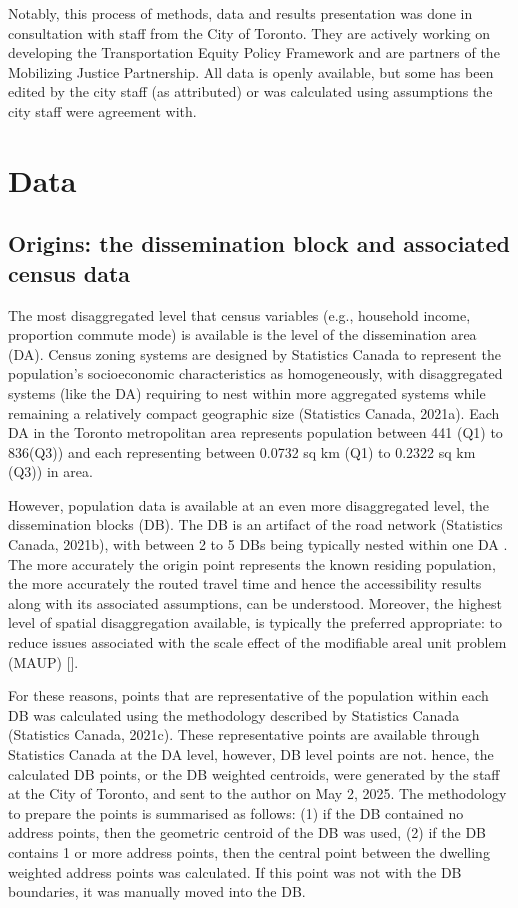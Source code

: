 \documentclass[
11pt, %
oneside, %
english, %
singlespacing, %
]{macthesis} %
\begin{document}
Notably, this process of methods, data and results presentation was done in consultation with staff from the City of Toronto. They are actively working on developing the Transportation Equity Policy Framework and are partners of the Mobilizing Justice Partnership. All data is openly available, but some has been edited by the city staff (as attributed) or was calculated using assumptions the city staff were agreement with.

\section{Data}\label{data}

\subsection{Origins: the dissemination block and associated census data}\label{origins-the-dissemination-block-and-associated-census-data}

The most disaggregated level that census variables (e.g., household income, proportion commute mode) is available is the level of the dissemination area (DA). Census zoning systems are designed by Statistics Canada to represent the population's socioeconomic characteristics as homogeneously, with disaggregated systems (like the DA) requiring to nest within more aggregated systems while remaining a relatively compact geographic size (Statistics Canada, 2021a). Each DA in the Toronto metropolitan area represents population between 441 (Q1) to 836(Q3)) and each representing between 0.0732 sq km (Q1) to 0.2322 sq km (Q3)) in area.

However, population data is available at an even more disaggregated level, the dissemination blocks (DB). The DB is an artifact of the road network (Statistics Canada, 2021b), with between 2 to 5 DBs being typically nested within one DA . The more accurately the origin point represents the known residing population, the more accurately the routed travel time and hence the accessibility results along with its associated assumptions, can be understood. Moreover, the highest level of spatial disaggregation available, is typically the preferred appropriate: to reduce issues associated with the scale effect of the modifiable areal unit problem (MAUP) {[}{]}.

For these reasons, points that are representative of the population within each DB was calculated using the methodology described by Statistics Canada (Statistics Canada, 2021c). These representative points are available through Statistics Canada at the DA level, however, DB level points are not. hence, the calculated DB points, or the DB weighted centroids, were generated by the staff at the City of Toronto, and sent to the author on May 2, 2025. The methodology to prepare the points is summarised as follows: (1) if the DB contained no address points, then the geometric centroid of the DB was used, (2) if the DB contains 1 or more address points, then the central point between the dwelling weighted address points was calculated. If this point was not with the DB boundaries, it was manually moved into the DB.
\end{document}
